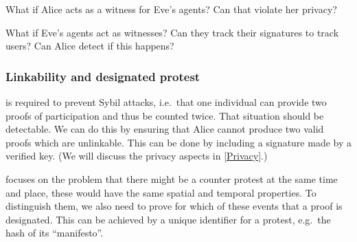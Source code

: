 \begin{question}
  What if Alice acts as a witness for Eve's agents?
  Can that violate her privacy?
\end{question}
\begin{question}
  What if Eve's agents act as witnesses?
  Can they track their signatures to track users?
  Can Alice detect if this happens?
\end{question}

\subsubsection{Linkability and designated protest}

 is required to prevent Sybil attacks, i.e.\ that one 
individual can provide two proofs of participation and thus be counted twice.
That situation should be detectable.
We can do this by ensuring that Alice cannot produce two valid proofs which
are unlinkable.
This can be done by including a signature made by a verified key.
(We will discuss the privacy aspects in \cref{Privacy}.)

 focuses on the problem that there might be a counter 
protest at the same time and place, these would have the same spatial and 
temporal properties.
To distinguish them, we also need to prove for which of these events that a 
proof is designated.
This can be achieved by a unique identifier for a protest, e.g.\ the hash of 
its \enquote{manifesto}.


